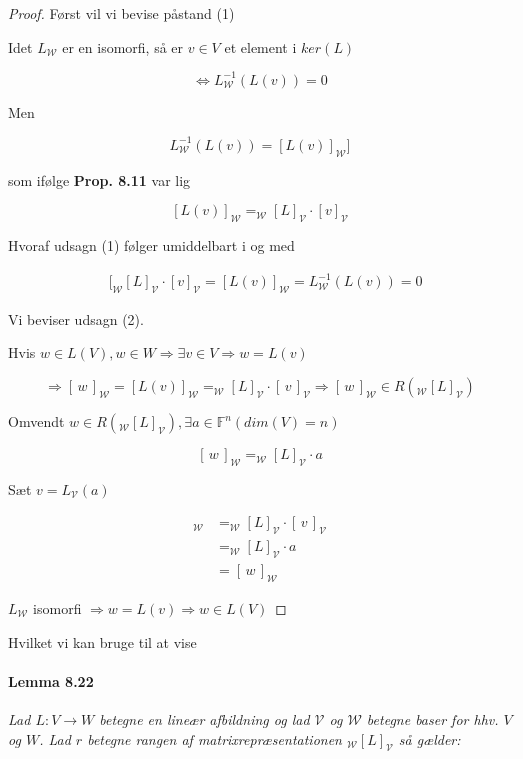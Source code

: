 \documentclass[paper=a4, fontsize=11pt]{scrartcl} %
\begin{document}
	
	
	\begin{proof}
		
		Først vil vi bevise påstand (1)
		
		Idet $L_{\mathcal{W}}$ er en isomorfi, så er $v \in V$ et element i $ker(L)$
		
		\[\Leftrightarrow L_{\mathcal{W}}^{-1}(L(v)) = 0 \tag{1}\]
		
		Men 
		
		\[L_{\mathcal{W}}^{-1}(L(v)) = [L(v)]_{\mathcal{W}}]\]
		
		som ifølge \textbf{Prop. 8.11} var lig
		
		\[[L(v)]_{\mathcal{W}} = _{\mathcal{W}}[L]_{\mathcal{V}} \cdot [v]_{\mathcal{V}}\]
		
		Hvoraf udsagn (1) følger umiddelbart i og med 
		
		\begin{align*}
		&[_{\mathcal{W}}[L]_{\mathcal{V}} \cdot [v]_{\mathcal{V}} = [L(v)]_{\mathcal{W}} = L_{\mathcal{W}}^{-1}(L(v)) = 0
		\end{align*}
		
		
		Vi beviser udsagn (2).
		
		Hvis $w \in L(V), w \in W \Rightarrow \exists v \in V \Rightarrow w = L(v)$
		
		\[\Rightarrow [\,w\,]_{\mathcal{W}} = [L(v)]_{\mathcal{W}} = _{\mathcal{W}}[L]_{\mathcal{V}} \cdot [\,v\,]_{\mathcal{V}} \Rightarrow [\,w\,]_{\mathcal{W}} \in R(_{\mathcal{W}}[L]_{\mathcal{V}})\]
		
		Omvendt $w \in R(_{\mathcal{W}}[L]_{\mathcal{V}}), \exists a \in \mathbb{F}^n (dim(V) = n)$
		
		\[[\,w\,]_{\mathcal{W}} = _{\mathcal{W}}[L]_{\mathcal{V}} \cdot a\]
		
		Sæt $v = L_{\mathcal{V}}(a)$
		
		\begin{align*}
		[L(v)]_{\mathcal{W}} &= _{\mathcal{W}}[L]_{\mathcal{V}} \cdot [\,v\,]_{\mathcal{V}}\\
		&= _{\mathcal{W}}[L]_{\mathcal{V}} \cdot a\\
		&= [\,w\,]_{\mathcal{W}}
		\end{align*}
		
		$L_{\mathcal{W}}$ isomorfi $\Rightarrow w = L(v) \Rightarrow w \in L(V)$
	\end{proof}
	Hvilket vi kan bruge til at vise 
	
	\paragraph{Lemma 8.22} \textit{Lad $L: V \rightarrow W$ betegne en lineær afbildning og lad $\mathcal{V}$ og $\mathcal{W}$ betegne baser for hhv. $V$ og $W$. Lad $r$ betegne rangen af matrixrepræsentationen $_{\mathcal{W}}[L]_{\mathcal{V}}$ så gælder:}
	
\end{document}
